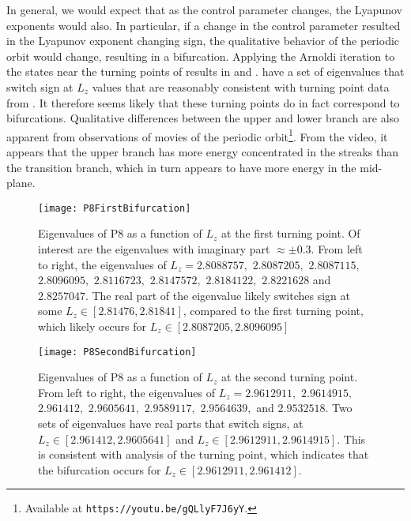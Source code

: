 In general, we would expect that as the control parameter changes, the Lyapunov exponents would also. In particular, if a change in the control parameter resulted in the Lyapunov exponent changing sign, the qualitative behavior of the periodic orbit would change, resulting in a bifurcation. Applying the Arnoldi iteration to the states near the turning points of  results in  and . 
\clearpage
  have a set of eigenvalues that switch sign at $L_z$ values that are reasonably consistent with turning point data from . It therefore seems likely that these turning points do in fact correspond to bifurcations. Qualitative differences between the upper and lower branch are also apparent from observations of movies of the periodic orbit\footnote{Available at {\tt https://youtu.be/gQLlyF7J6yY}.}. From the video, it appears that the upper branch has more energy concentrated in the streaks than the transition branch, which in turn appears to have more energy in the mid-plane. 
\begin{figure}[t]
\texttt{[image: P8FirstBifurcation]}
\caption{Eigenvalues of P8 as a function of $L_z$ at the first turning point. Of interest are the eigenvalues with imaginary part $\approx \pm 0.3$. From left to right, the eigenvalues of $L_z = 2.8088757,$ $2.8087205,$ $2.8087115,$ $2.8096095,$ $2.8116723,$ $2.8147572,$ $2.8184122,$ $2.8221628$ and $2.8257047$. The real part of the eigenvalue likely switches sign at some $L_z \in [2.81476,2.81841]$, compared to the first turning point, which likely occurs for $L_z \in [2.8087205, 2.8096095]$  }\label{fig:P8FirstBifurcation}
\end{figure}


\begin{figure}[h]
\texttt{[image: P8SecondBifurcation]}
\caption{Eigenvalues of P8 as a function of $L_z$ at the second turning point. From left to right, the eigenvalues of  $L_z =  2.9612911,$ $2.9614915,$ $2.961412,$ $2.9605641,$ $2.9589117,$ $2.9564639,$ and $2.9532518$. Two sets of eigenvalues have real parts that switch signs, at $L_z \in [2.961412,2.9605641]$ and $L_z \in [ 2.9612911,2.9614915]$. This is consistent with analysis of the turning point, which indicates that the bifurcation occurs for $L_z \in [ 2.9612911, 2.961412]$.}\label{fig:P8SecondBifurcation}
\end{figure}





  